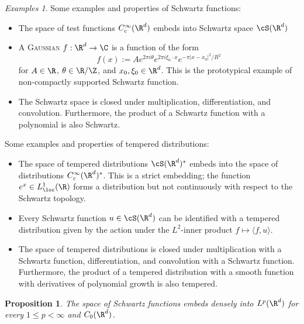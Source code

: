 \documentclass[reqno]{amsart}
\newtheorem{proposition}[theorem]{Proposition}
\theoremstyle{definition}
\theoremstyle{remark}
\newtheorem*{examples}{Examples}
\renewcommand{\emph}{\textsc}
\begin{document}
\begin{examples}
Some examples and properties of Schwartz functions:
\begin{itemize}
	\item The space of test functions $C^\infty_c (\R^d)$ embeds into Schwartz space $\cS (\R^d)$
	
	\item A \emph{Gaussian} $f: \R^d \to \C$ is a function of the form 
			\[ f(x) := A e^{2\pi i \theta} e^{2\pi i \xi_0 \cdot x} e^{- \pi |x - x_0|^2/ R^2} \]
		for $A \in \R$, $\theta \in \R/\Z$, and $x_0, \xi_0 \in \R^d$. This is the prototypical example of non-compactly supported Schwartz function. 
	
	\item The Schwartz space is closed under multiplication, differentiation, and convolution. Furthermore, the product of a Schwartz function with a polynomial is also Schwartz. 
	
\end{itemize}	
Some examples and properties of tempered distributions:
\begin{itemize} 
	\item The space of tempered distributions $\cS (\R^d)^*$ embeds into the space of distributions $C^\infty_c (\R^d)^*$. This is a strict embedding; the function $e^x \in L^1_{\loc} (\R)$ forms a distribution but not continuously with respect to the Schwartz topology. 

	\item Every Schwartz function $u \in \cS (\R^d)$ can be identified with a tempered distribution given by the action under the $L^2$-inner product $f \mapsto \langle f, u \rangle$. 
	
	\item The space of tempered distributions is closed under multiplication with a Schwartz function, differentiation, and convolution with a Schwartz function. Furthermore, the product of a tempered distribution with a smooth function with derivatives of polynomial growth is also tempered. 
\end{itemize}	
\end{examples}



\begin{proposition}
	The space of Schwartz functions embeds densely into $L^p (\R^d)$ for every $1 \leq p < \infty$ and $C_0 (\R^d)$. 
\end{proposition}
\end{document}

